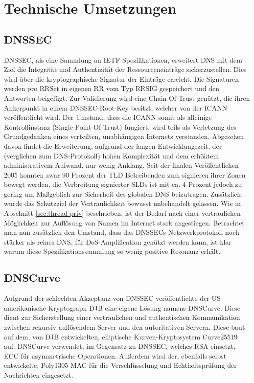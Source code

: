 \chapter{Technische Umsetzungen}
\label{chap:technologies}

\section{DNSSEC}
\label{sec:tec-dnssec}
DNSSEC, als eine Sammlung an IETF-Spezifikationen, erweitert DNS mit dem Ziel die Integrität und Authentizität der Ressourceneinträge sicherzustellen\cite{Arends2005}. Dies wird über die kryptographische Signatur der Einträge erreicht. Die Signaturen werden pro RRSet in eigenen RR vom Typ RRSIG gespeichert und den Antworten beigefügt. Zur Validierung wird eine Chain-Of-Trust genützt, die ihren Ankerpunkt in einem \ac{DNSSEC}-Root-Key besitzt, welcher von der ICANN veröffentlicht wird. Der Umstand, dass die ICANN somit als alleinige Kontrollinstanz (Single-Point-Of-Trust) fungiert, wird teils als Verletzung des Grundgedanken eines verteilten, unabhängigen Internets verstanden\cite{Finch2014}.
Abgesehen davon findet die Erweiterung, aufgrund der langen Entwicklungszeit, der (verglichen zum DNS-Protokoll) hohen Komplexität und dem erhöhtem administrativem Aufwand, nur wenig Anklang. Seit der finalen Veröffentlichen 2005 konnten zwar 90 Prozent der TLD Betreibenden zum signieren ihrer Zonen bewegt werden, die Verbreitung signierter SLDs ist mit ca. 4 Prozent jedoch zu gering um Maßgeblich zur Sicherheit des globalen DNS beizutragen\cite{DCCommunications2018}. Zusätzlich wurde das Schutzziel der Vertraulichkeit bewusst unbehandelt gelassen. Wie in Abschnitt \ref{sec:thread-priv} beschrieben, ist der Bedarf nach einer vertraulichen Möglichkeit zur Auflösung von Namen im Internet stark angestiegen. Betrachtet man nun zusätzlich den Umstand, dass das \ac{DNSSEC}s Netzwerkprotokoll noch stärker als reines DNS, für \ac{DoS}-Amplification genützt werden kann, ist klar warum diese Spezifikationssammlung so wenig positive Resonanz erhält\cite{Antic2014}.

\section{DNSCurve}
\label{sec:tec-dnscurve}
Aufgrund der schlechten Akzeptanz von \ac{DNSSEC} veröffentlichte der US-amerikanische Kryptograph \ac{DJB} eine eigene Lösung namens DNSCurve. Diese dient zur Sicherstellung einer vertraulichen und authentischen Kommunikation zwischen rekursiv auflösendem Server und den autoritativen Servern. Diese baut auf dem, von \ac{DJB} entwickelten, elliptische Kurven-Kryptosystem Curve25519 auf. DNSCurve verwendet, im Gegensatz zu \ac{DNSSEC}, welches RSA einsetzt, \ac{ECC} für asymmetrische Operationen. Außerdem wird der, ebenfalls selbst entwickelte, Poly1305 \ac{MAC} für die Verschlüsselung und Echtheitsprüfung der Nachrichten eingesetzt. 


